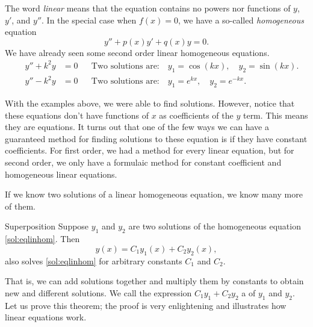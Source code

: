 The word \emph{linear} means that the equation contains no powers nor
functions of $y$, $y'$, and $y''$. In the special case when $f(x) = 0$, we have a so-called
\emph{homogeneous}
equation
\begin{equation} \label{sol:eqlinhom}
y'' + p(x)y' + q(x)y = 0 .
\end{equation}
We have already seen some second order linear homogeneous equations.
\begin{align*}
\qquad y'' + k^2 y & = 0 &
& \text{Two solutions are:} \quad y_1 = \cos (kx), \quad y_2 = \sin(kx) . \qquad \\
\qquad y'' - k^2 y & = 0 &
& \text{Two solutions are:} \quad y_1 = e^{kx}, \quad y_2 = e^{-kx} . \qquad
\end{align*}

With the examples above, we were able to find solutions. However, notice that these equations don't have functions of $x$ as coefficients of the $y$ term. This means they are  equations. It turns out that one of the few ways we can have a guaranteed method for finding solutions to these equation is if they have constant coefficients. For first order, we had a method for every linear equation, but for second order, we only have a formulaic method for constant coefficient and homogeneous linear equations. 


If we know two solutions of a linear homogeneous equation, we know many
more of them.

\begin{theorem1}{Superposition}
Suppose $y_1$ and $y_2$ are two solutions of the
homogeneous equation \eqref{sol:eqlinhom}.  Then 
\begin{equation*}
y(x) = C_1 y_1(x) + C_2 y_2(x) ,
\end{equation*}
also solves \eqref{sol:eqlinhom} for arbitrary constants $C_1$ and $C_2$.
\end{theorem1}

That is, we can add solutions together and multiply them by constants to
obtain new and different solutions.  We call
the expression $C_1 y_1 + C_2 y_2$ a
\emph{} of $y_1$ and $y_2$.
Let us
prove this theorem; the
proof is very enlightening and illustrates how linear equations work.

